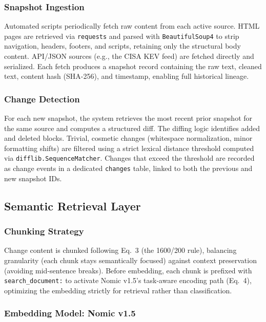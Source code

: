 \documentclass[
]{article}
\begin{document}
\subsubsection{Snapshot Ingestion}

Automated scripts periodically fetch raw content from each active source. HTML pages are retrieved via \texttt{requests} and parsed with \texttt{BeautifulSoup4} to strip navigation, headers, footers, and scripts, retaining only the structural body content. API/JSON sources (e.g., the CISA KEV feed) are fetched directly and serialized. Each fetch produces a snapshot record containing the raw text, cleaned text, content hash (SHA-256), and timestamp, enabling full historical lineage.

\subsubsection{Change Detection}

For each new snapshot, the system retrieves the most recent prior snapshot for the same source and computes a structured diff. The diffing logic identifies added and deleted blocks. Trivial, cosmetic changes (whitespace normalization, minor formatting shifts) are filtered using a strict lexical distance threshold computed via \texttt{difflib.SequenceMatcher}. Changes that exceed the threshold are recorded as change events in a dedicated \texttt{changes} table, linked to both the previous and new snapshot IDs.

\subsection{Semantic Retrieval Layer}\label{semantic-retrieval-layer-deltarag}

\subsubsection{Chunking Strategy}

Change content is chunked following Eq.~3 (the 1600/200 rule), balancing granularity (each chunk stays semantically focused) against context preservation (avoiding mid-sentence breaks). Before embedding, each chunk is prefixed with \texttt{search\_document:} to activate Nomic v1.5's task-aware encoding path (Eq.~4), optimizing the embedding strictly for retrieval rather than classification.

\subsubsection{Embedding Model: Nomic v1.5}
\end{document}
